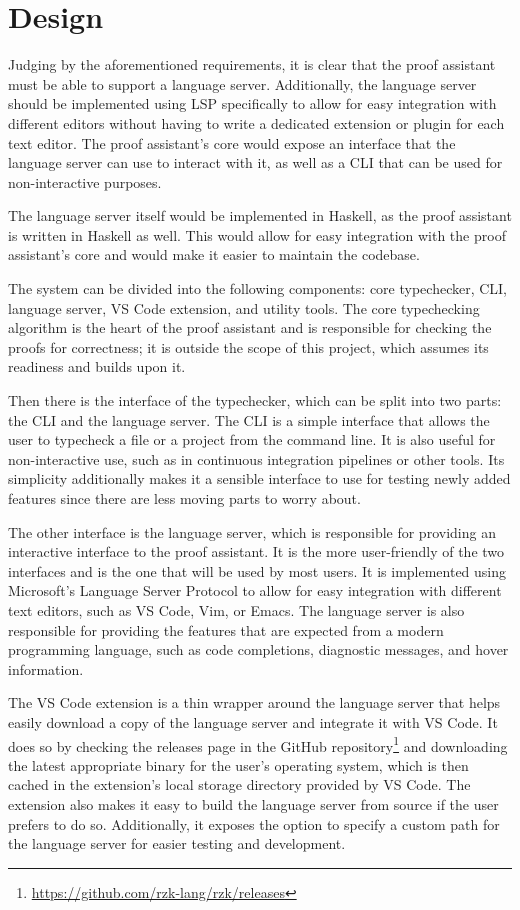 \section{Design}

Judging by the aforementioned requirements, it is clear that the proof assistant must be able to support a language server.
Additionally, the language server should be implemented using LSP specifically to allow for easy integration with
different editors without having to write a dedicated extension or plugin for each text editor.
The proof assistant's core would expose an interface that the language server can use to interact with it,
as well as a CLI that can be used for non-interactive purposes.

The language server itself would be implemented in Haskell, as the proof assistant is written in Haskell as well.
This would allow for easy integration with the proof assistant's core and would make it easier to maintain the codebase.

The system can be divided into the following components: core typechecker, CLI, language server, VS Code extension, and utility tools.
The core typechecking algorithm is the heart of the proof assistant and is responsible for checking the proofs for correctness;
it is outside the scope of this project, which assumes its readiness and builds upon it.

Then there is the interface of the typechecker, which can be split into two parts: the CLI and the language server.
The CLI is a simple interface that allows the user to typecheck a file or a project from the command line.
It is also useful for non-interactive use, such as in continuous integration pipelines or other tools.
Its simplicity additionally makes it a sensible interface to use for testing newly added features since
there are less moving parts to worry about.

The other interface is the language server, which is responsible for providing an interactive interface to the proof assistant.
It is the more user-friendly of the two interfaces and is the one that will be used by most users.
It is implemented using Microsoft's Language Server Protocol to allow for easy integration with different text editors,
such as VS Code, Vim, or Emacs.
The language server is also responsible for providing the features that are expected from a modern programming language,
such as code completions, diagnostic messages, and hover information.

The VS Code extension is a thin wrapper around the language server that helps easily download a copy of the language server
and integrate it with VS Code.
It does so by checking the releases page in the GitHub repository\footnote{\url{https://github.com/rzk-lang/rzk/releases}}
and downloading the latest appropriate binary for the user's operating system, which is then cached in the extension's
local storage directory provided by VS Code.
The extension also makes it easy to build the language server from source if the user prefers to do so.
Additionally, it exposes the option to specify a custom path for the language server for easier testing and development.

